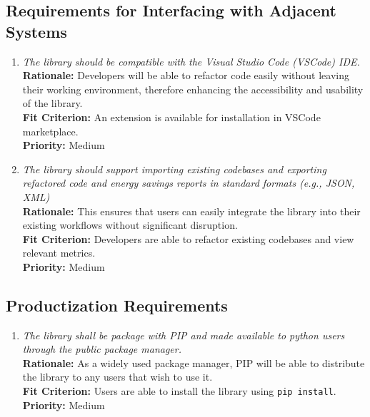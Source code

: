 \documentclass[12pt]{article}
\begin{document}
\subsection{Requirements for Interfacing with Adjacent Systems}
\begin{enumerate}[label=OER-IAS \arabic*., wide=0pt, leftmargin=*]
  \item \emph{The library should be compatible with the Visual Studio
    Code (VSCode) IDE.}\\[2mm]
    {\bf Rationale:} Developers will be able to refactor code easily
    without leaving their working environment, therefore enhancing
    the accessibility and usability of the library.\\
    {\bf Fit Criterion:} An extension is available for installation
    in VSCode marketplace.\\
    {\bf Priority:} Medium
  \item \emph{The library should support importing existing codebases
      and exporting refactored code and energy savings reports in
    standard formats (e.g., JSON, XML)}\\[2mm]
    {\bf Rationale:} This ensures that users can easily integrate the
    library into their existing workflows without significant disruption.\\
    {\bf Fit Criterion:} Developers are able to refactor existing
    codebases and view relevant metrics.\\
    {\bf Priority:} Medium
\end{enumerate}

\subsection{Productization Requirements}
\begin{enumerate}[label=OER-PR \arabic*., wide=0pt, leftmargin=*]
  \item \emph{The library shall be package with PIP and made
    available to python users through the public package manager.}\\[2mm]
    {\bf Rationale:} As a widely used package manager, PIP will be
    able to distribute the library to any users that wish to use it.\\
    {\bf Fit Criterion:} Users are able to install the library using
    \texttt{pip install}. \\
    {\bf Priority:} Medium
\end{enumerate}
\end{document}
